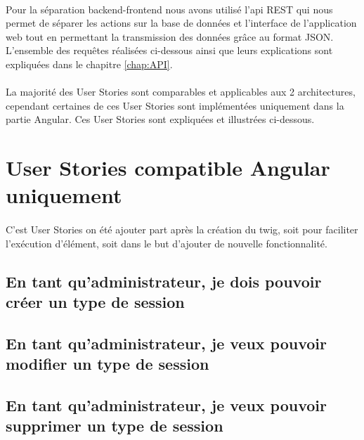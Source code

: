 \paragraph{}
	Pour la séparation backend-frontend nous avons utilisé l'api REST qui nous permet de séparer les actions sur la base de données et l'interface de l'application web tout en permettant la transmission des données grâce au format JSON.
	L'ensemble des requêtes réalisées ci-dessous ainsi que leurs explications sont expliquées dans le chapitre \ref{chap:API}. 
	
\paragraph{}
	La majorité des User Stories sont comparables et applicables aux 2 architectures, cependant certaines de ces User Stories sont implémentées uniquement dans la partie Angular. Ces User Stories sont expliquées et illustrées ci-dessous. 

\newpage
\section{User Stories compatible Angular uniquement}
	\paragraph{}
		C'est User Stories on été ajouter part après la création du twig, soit pour faciliter l'exécution d'élément, soit dans le but d'ajouter de nouvelle fonctionnalité. 
	
	\subsection{En tant qu'administrateur, je dois pouvoir créer un type de session}
		
	
	\newpage
	\subsection{En tant qu'administrateur, je veux pouvoir modifier un type de session}
		
	
	\newpage
	\subsection{En tant qu'administrateur, je veux pouvoir supprimer un type de session}
		
	
